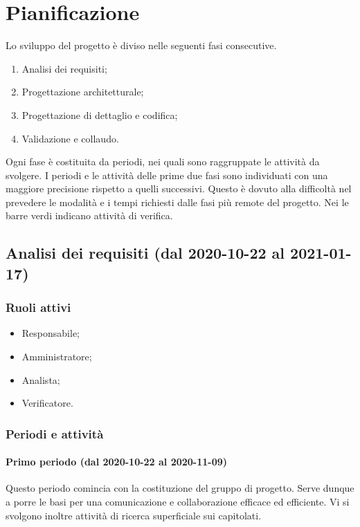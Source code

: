 \section{Pianificazione}
Lo sviluppo del progetto è diviso nelle seguenti fasi consecutive.
\begin{enumerate}
	\item Analisi dei requisiti;
	\item Progettazione architetturale;
	\item Progettazione di dettaglio e codifica;
	\item Validazione e collaudo.
\end{enumerate}
Ogni fase è costituita da periodi, nei quali sono raggruppate le attività da svolgere.
I periodi e le attività delle prime due fasi sono individuati con una maggiore precisione rispetto a quelli successivi. Questo è dovuto alla difficoltà nel prevedere le modalità e i tempi richiesti dalle fasi più remote del progetto.
Nei  le barre verdi indicano attività di verifica.

\subsection{Analisi dei requisiti (dal 2020-10-22 al 2021-01-17)}

\subsubsection{Ruoli attivi}
\begin{itemize}
	\item Responsabile;
	\item Amministratore;
	\item Analista;
	\item Verificatore.
\end{itemize}

\subsubsection{Periodi e attività}

\paragraph{Primo periodo (dal 2020-10-22 al 2020-11-09)}
Questo periodo comincia con la costituzione del gruppo di progetto. Serve dunque a porre le basi per una comunicazione e collaborazione efficace ed efficiente. Vi si svolgono inoltre attività di ricerca superficiale sui capitolati.

